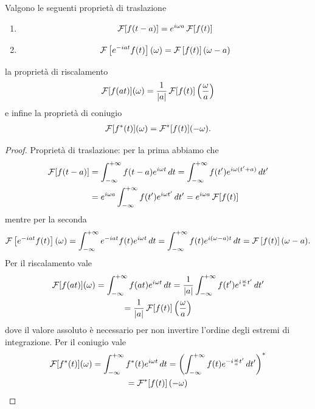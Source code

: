 \begin{theorem}[  ] \label{thm: traslazione, riscalamento e coniugio della trasformata di Fourier}
  Valgono le seguenti proprietà di traslazione 
  \begin{enumerate}
    \item 
      \begin{align}
        \operatorname{\mathcal{F}}[f(t - a)] = e^{i\omega a}\operatorname{\mathcal{F}}[f(t)]
      \end{align}
    \item 
      \begin{align}
        \operatorname{\mathcal{F}}\left[ e^{-i a t} f(t) \right](\omega) = \operatorname{\mathcal{F}}\left[ f(t) \right](\omega - a)
      \end{align}
  \end{enumerate}
  la proprietà di riscalamento
  \begin{align}
    \operatorname{\mathcal{F}}[f(at)](\omega) = \frac1{\left|{a}\right|} \operatorname{\mathcal{F}}[f(t)]\left( \frac{\omega}{a} \right)
  \end{align}
  e infine la proprietà di coniugio
  \begin{align}
    \operatorname{\mathcal{F}}[f^*(t)](\omega) = {\operatorname{\mathcal{F}}^*[f(t)](-\omega)}.
  \end{align}
\end{theorem}
\begin{proof}
  Proprietà di traslazione: per la prima abbiamo che
  \begin{align}
    \operatorname{\mathcal{F}}[f(t - a)] &= \int_{-\infty}^{+\infty} f(t - a) e^{i\omega t} \, dt = \int_{-\infty}^{+\infty} f(t') e^{i\omega (t' + a)} \, dt' 
    \\
    &= e^{i\omega a} \int_{-\infty}^{+\infty} f(t') e^{i\omega t'} \, dt' = e^{i\omega a}\operatorname{\mathcal{F}}[f(t)]
  \end{align}
  mentre per la seconda
  \begin{align}
    \operatorname{\mathcal{F}}\left[ e^{-i a t} f(t) \right](\omega) = \int_{-\infty}^{+\infty} e^{-i a t} f(t) e^{i\omega t} \, dt 
    = \int_{-\infty}^{+\infty} f(t ) e^{i(\omega -a) t} \, dt = \operatorname{\mathcal{F}}\left[ f(t) \right](\omega - a).
  \end{align}
  Per il riscalamento vale 
  \begin{gather}
    \operatorname{\mathcal{F}}[f(at)](\omega) = \int_{-\infty}^{+\infty} f(at) e^{i\omega t} \, dt 
    = \frac{1}{\left|{a}\right|} \int_{-\infty}^{+\infty} f(t') e^{i \frac{\omega}{a} t'} \, dt' 
    \\ 
    = \frac1{\left|{a}\right|} \operatorname{\mathcal{F}}[f(t)]\left( \frac{\omega}{a} \right)
  \end{gather}
  dove il valore assoluto è necessario per non invertire l'ordine degli estremi di integrazione.
  Per il coniugio vale 
  \begin{gather}
    \operatorname{\mathcal{F}}[f^*(t)](\omega) = \int_{-\infty}^{+\infty} f^*(t) e^{i\omega t} \, dt 
    = \left( \int_{-\infty}^{+\infty} f(t) e^{- i \frac{\omega}{a} t'} \, dt' \right)^*
    \\ 
    = \operatorname{\mathcal{F}}^*[f(t)]\left(-\omega \right)
  \end{gather}
\end{proof}

